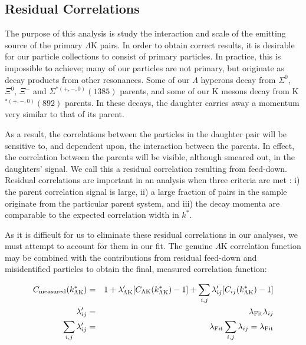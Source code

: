 \documentclass[ALICE,manyauthors]{cernphprep}
\newcommand{\kstar}{$k^{*}$\xspace}
\newcommand{\Lam}{$\Lambda$\xspace}
\newcommand{\LamK}{$\Lambda$K\xspace}
\begin{document}
\subsection{Residual Correlations}
\label{ResidualCorrelations}

The purpose of this analysis is study the interaction and scale of the emitting source of the primary \LamK pairs.
In order to obtain correct results, it is desirable for our particle collections to consist of primary particles.
In practice, this is impossible to achieve; many of our particles are not primary, but originate as decay products from other resonances.
Some of our \Lam hyperons decay from $\Sigma^{0}$, $\Xi^{0}$, $\Xi^{-}$ and $\Sigma^{*(+,-,0)}(1385)$ parents, and some of our K mesons decay from K$^{*(+,-,0)}(892)$ parents.
In these decays, the daughter carries away a momentum very similar to that of its parent.

As a result, the correlations between the particles in the daughter pair will be sensitive to, and dependent upon, the interaction between the parents.
In effect, the correlation between the parents will be visible, although smeared out, in the daughters' signal.
We call this a residual correlation resulting from feed-down.  
Residual correlations are important in an analysis when three criteria are met \cite{Kisiel:2014mma}: i) the parent correlation signal is large, ii) a large fraction of pairs in the sample originate from the particular parent system, and iii) the decay momenta are comparable to the expected correlation width in \kstar. 

As it is difficult for us to eliminate these residual correlations in our analyses, we must attempt to account for them in our fit.
The genuine \LamK correlation function may be combined with the contributions from residual feed-down and misidentified particles to obtain the final, measured correlation function:


\begin{eqnarray}
\label{eqn:Residuals} 
 C_{\mathrm{measured}}(k^{*}_{\Lambda\mathrm{K}}) &=& 1 + \lambda'_{\Lambda\mathrm{K}}[C_{\Lambda\mathrm{K}}(k^{*}_{\Lambda\mathrm{K}}) - 1] + \sum\limits_{i,j}  \lambda'_{ij}[C_{ij}(k^{*}_{\Lambda\mathrm{K}})-1] \\
 \lambda_{ij}' &=& \lambda_{\mathrm{Fit}}\lambda_{ij} \notag \\
 \sum\limits_{i,j}\lambda_{ij}' &=&  \lambda_{\mathrm{Fit}}\sum\limits_{i,j}\lambda_{ij} = \lambda_{\mathrm{Fit}} \notag
\label{eqn:CfwRes} 
\end{eqnarray}
\end{document}
